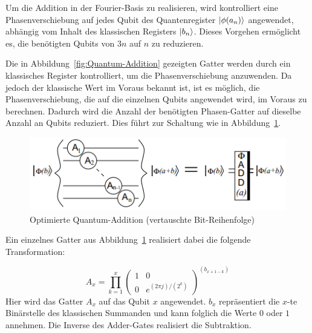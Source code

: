 \documentclass[lettersize,journal]{IEEEtran}
\begin{document}
Um die Addition in der Fourier-Basis zu realisieren,
wird kontrolliert eine Phasenverschiebung auf jedes Qubit des Quantenregister
\(\ket{\phi(a_n)}\) angewendet,
abhängig vom Inhalt des klassischen Registers \(\ket{b_n}\).
Dieses Vorgehen ermöglicht es,
die benötigten Qubits von \(3n\) auf \(n\) zu reduzieren.

Die in Abbildung~\ref{fig:Quantum-Addition} gezeigten Gatter werden durch ein klassisches Register kontrolliert,
um die Phasenverschiebung anzuwenden.
Da jedoch der klassische Wert im Voraus bekannt ist,
ist es möglich, die Phasenverschiebung, die auf die einzelnen Qubits angewendet wird,
im Voraus zu berechnen.
Dadurch wird die Anzahl der benötigten Phasen-Gatter auf dieselbe Anzahl an Qubits reduziert.
Dies führt zur Schaltung wie in Abbildung~\ref{fig:A_gate}.

\begin{figure}[!h]
\caption{Optimierte Quantum-Addition (vertauschte Bit-Reihenfolge)~\cite{beauregard2003circuit}}
\label{fig:A_gate}
\includegraphics[width=\linewidth]{A_gate.PNG}
\centering
\end{figure}
Ein einzelnes Gatter aus Abbildung~\ref{fig:A_gate} realisiert dabei die folgende Transformation:

\begin{equation}
A_{x} = \prod_{k=1}^x{
\begin{pmatrix}
  1 & 0 \\
  0 & e^{({2\pi j})/({2^{k}})}
\end{pmatrix}^{(b_{x+1-k})}}
\end{equation}
Hier wird das Gatter \(A_{x}\) auf das Qubit \(x\) angewendet.
\(b_{x}\) repräsentiert die \(x\)-te Binärstelle des klassischen Summanden und
kann folglich die Werte \(0\) oder \(1\) annehmen.
Die Inverse des Adder-Gates realisiert die Subtraktion. 
\end{document}
